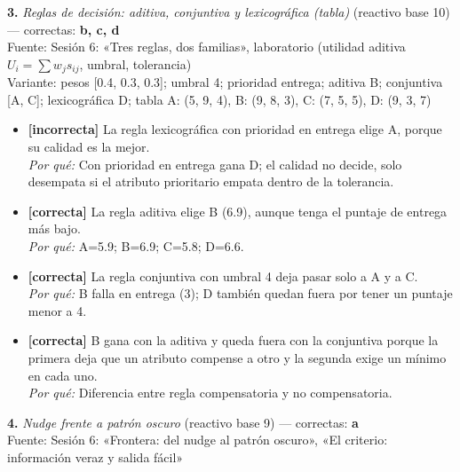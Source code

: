 \documentclass[10pt,letterpaper]{article}
\begin{document}
\vspace{3pt}\noindent\textbf{3.} \textit{Reglas de decisión: aditiva, conjuntiva y lexicográfica (tabla)} (reactivo base 10) — correctas: \textbf{b, c, d}\\[-1pt]
{\scriptsize Fuente: Sesión 6: «Tres reglas, dos familias», laboratorio (utilidad aditiva $U_i=\sum w_j s_{ij}$, umbral, tolerancia)}
\\{\scriptsize Variante: pesos [0.4, 0.3, 0.3]; umbral 4; prioridad entrega; aditiva B; conjuntiva [A, C]; lexicográfica D; tabla A: (5, 9, 4), B: (9, 8, 3), C: (7, 5, 5), D: (9, 3, 7)}
\begin{itemize}[leftmargin=1.2em,itemsep=0pt,topsep=1pt,parsep=0pt]
\item[\textbf{a)}] {\footnotesize \textbf{[incorrecta]} La regla lexicográfica con prioridad en entrega elige A, porque su calidad es la mejor.\\ \textit{Por qué:} Con prioridad en entrega gana D; el calidad no decide, solo desempata si el atributo prioritario empata dentro de la tolerancia.}
\item[\textbf{b)}] {\footnotesize \textbf{[correcta]} La regla aditiva elige B (6.9), aunque tenga el puntaje de entrega más bajo.\\ \textit{Por qué:} A=5.9; B=6.9; C=5.8; D=6.6.}
\item[\textbf{c)}] {\footnotesize \textbf{[correcta]} La regla conjuntiva con umbral 4 deja pasar solo a A y a C.\\ \textit{Por qué:} B falla en entrega (3); D también quedan fuera por tener un puntaje menor a 4.}
\item[\textbf{d)}] {\footnotesize \textbf{[correcta]} B gana con la aditiva y queda fuera con la conjuntiva porque la primera deja que un atributo compense a otro y la segunda exige un mínimo en cada uno.\\ \textit{Por qué:} Diferencia entre regla compensatoria y no compensatoria.}
\end{itemize}
\vspace{3pt}\noindent\textbf{4.} \textit{Nudge frente a patrón oscuro} (reactivo base 9) — correctas: \textbf{a}\\[-1pt]
{\scriptsize Fuente: Sesión 6: «Frontera: del nudge al patrón oscuro», «El criterio: información veraz y salida fácil»}
\end{document}
